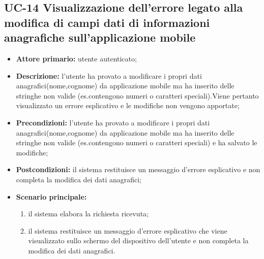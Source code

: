\subsection{UC-14 Visualizzazione dell'errore legato alla modifica di campi dati di informazioni anagrafiche sull'applicazione mobile}
\begin{itemize}
	\item \textbf{Attore primario:} utente autenticato;

	\item \textbf{Descrizione:} l'utente ha provato a modificare i propri dati anagrafici(nome,cognome) da applicazione mobile ma ha inserito delle stringhe non valide (es.contengono numeri o caratteri speciali).Viene pertanto visualizzato un errore esplicativo e le modifiche non vengono apportate;

	\item \textbf{Precondizioni:} l'utente ha provato a modificare i propri dati anagrafici(nome,cognome) da applicazione mobile ma ha inserito delle stringhe non valide (es.contengono numeri o caratteri speciali) e ha salvato le modifiche;

	\item \textbf{Postcondizioni:} il sistema restituisce un messaggio d'errore esplicativo e non completa la modifica dei dati anagrafici;

	\item \textbf{Scenario principale:}
	
		\begin{enumerate}
   			 \item il sistema elabora la richiesta ricevuta;
    		 \item il sistema restituisce un messaggio d'errore esplicativo che viene visualizzato sullo schermo del dispositivo dell'utente e non completa la modifica dei dati anagrafici.
		\end{enumerate}
\end{itemize}

